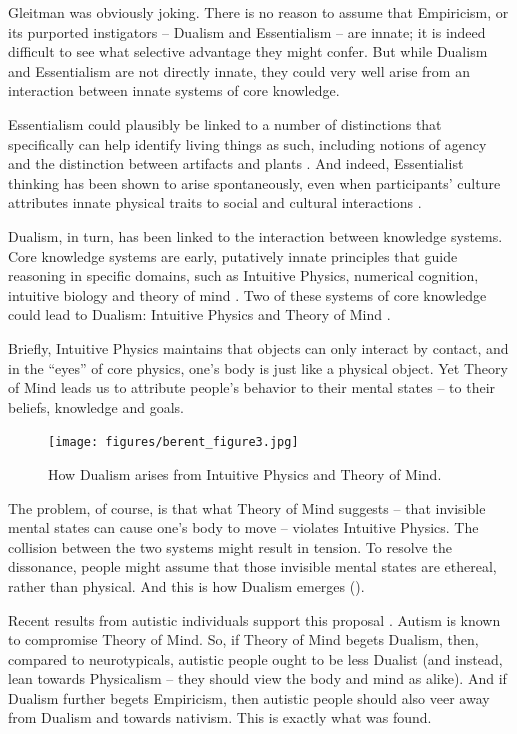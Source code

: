 \documentclass[output=paper,colorlinks,citecolor=brown
]{langscibook}
\begin{document}
Gleitman was obviously joking. There is no reason to assume that Empiricism, or its purported instigators -- Dualism and Essentialism -- are innate; it is indeed difficult to see what selective advantage they might confer. But while Dualism and Essentialism are not directly innate, they could very well arise from an interaction between innate systems of core knowledge.

Essentialism could plausibly be linked to a number of distinctions that specifically can help identify living things as such, including notions of agency \citep{setoh2013young} and the distinction between artifacts and plants \citep{wertz2014selective}. And indeed, Essentialist thinking has been shown to arise spontaneously, even when participants’ culture attributes innate physical traits to social and cultural interactions \citep{astuti2004constraints}.

Dualism, in turn, has been linked to the interaction between knowledge systems. Core knowledge systems are early, putatively innate principles that guide reasoning in specific domains, such as Intuitive Physics, numerical cognition, intuitive biology and theory of mind \citep{spelke2007core}. Two of these systems of core knowledge could lead to Dualism: Intuitive Physics and Theory of Mind \citep{bloom2005descartes}. 

Briefly, Intuitive Physics maintains that objects can only interact by contact, and in the ``eyes'' of core physics, one’s body is just like a physical object. Yet Theory of Mind leads us to attribute people’s behavior to their mental states -- to their beliefs, knowledge and goals. 

\begin{figure}
    \centering
    \texttt{[image: figures/berent\_figure3.jpg]}
    \caption{How Dualism arises from Intuitive Physics and Theory of Mind.}
    \label{fig:figure3}
\end{figure}

The problem, of course, is that what Theory of Mind suggests -- that invisible mental states can cause one’s body to move -- violates Intuitive Physics. The collision between the two systems might result in tension. To resolve the dissonance, people might assume that those invisible mental states are ethereal, rather than physical. And this is how Dualism emerges (). 

Recent results from autistic individuals support this proposal \citep{berent2022autism}. Autism is known to compromise Theory of Mind. So, if Theory of Mind begets Dualism, then, compared to neurotypicals, autistic people ought to be less Dualist (and instead, lean towards Physicalism -- they should view the body and mind as alike). And if Dualism further begets Empiricism, then autistic people should also veer away from Dualism and towards nativism. This is exactly what was found.
\end{document}
